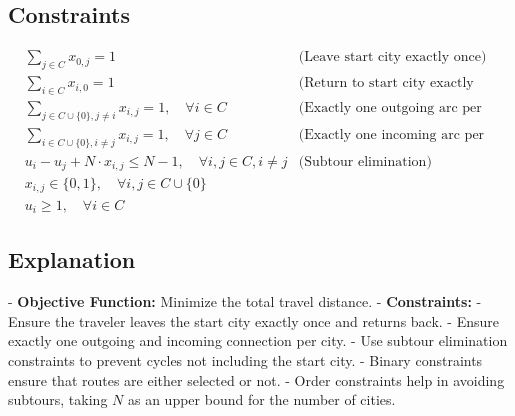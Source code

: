 \documentclass{article}
\begin{document}
\subsection*{Constraints}
\begin{align}
    & \sum_{j \in C} x_{0,j} = 1 \quad &\text{(Leave start city exactly once)} \\
    & \sum_{i \in C} x_{i,0} = 1 \quad &\text{(Return to start city exactly once)} \\
    & \sum_{j \in C \cup \{0\}, j \neq i} x_{i,j} = 1, \quad \forall i \in C &\text{(Exactly one outgoing arc per city)} \\
    & \sum_{i \in C \cup \{0\}, i \neq j} x_{i,j} = 1, \quad \forall j \in C &\text{(Exactly one incoming arc per city)} \\
    & u_i - u_j + N \cdot x_{i,j} \leq N-1, \quad \forall i, j \in C, i \neq j &\text{(Subtour elimination)} \\
    & x_{i,j} \in \{0, 1\}, \quad \forall i, j \in C \cup \{0\} \\
    & u_i \geq 1, \quad \forall i \in C
\end{align}

\subsection*{Explanation}
- \textbf{Objective Function:} Minimize the total travel distance.
- \textbf{Constraints:} 
  - Ensure the traveler leaves the start city exactly once and returns back.
  - Ensure exactly one outgoing and incoming connection per city.
  - Use subtour elimination constraints to prevent cycles not including the start city.
  - Binary constraints ensure that routes are either selected or not.
  - Order constraints help in avoiding subtours, taking $N$ as an upper bound for the number of cities.
\end{document}
